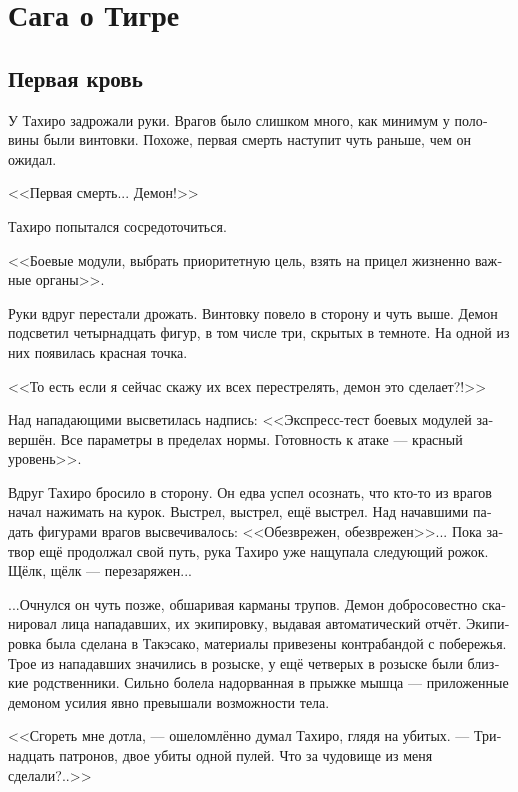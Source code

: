 \documentclass[a4paper,12pt,fleqn]{book}\usepackage{polyglossia}\setdefaultlanguage[babelshorthands=true]{russian}\setotherlanguage{english}\defaultfontfeatures{Ligatures=TeX,Mapping=tex-text}\usepackage{xcolor}\newcommand{\ml}[3]{#2}
\newcommand{\asterism}{\vspace{1em}{\centering\Large\bfseries$\ast~\ast~\ast$\par}\vspace{1em}}
\begin{document}
{\chapter{Сага о Тигре}


\section{Первая кровь}

У Тахиро задрожали руки.
Врагов было слишком много, как минимум у половины были винтовки.
Похоже, первая смерть наступит чуть раньше, чем он ожидал.

<<Первая смерть...
Демон!>>

Тахиро попытался сосредоточиться.

\ml{$0$}
{<<Боевые модули, выбрать приоритетную цель, взять на прицел жизненно важные органы>>.}
{``\textit{Combat modules, choose a priority target, aim a vital organ.}''}

Руки вдруг перестали дрожать.
Винтовку повело в сторону и чуть выше.
Демон подсветил четырнадцать фигур, в том числе три, скрытых в темноте.
На одной из них появилась красная точка.

<<То есть если я сейчас скажу их всех перестрелять, демон это сделает?!>>

Над нападающими высветилась надпись:
<<Экспресс-тест боевых модулей завершён.
Все параметры в пределах нормы.
Готовность к атаке --- красный уровень>>.

Вдруг Тахиро бросило в сторону.
Он едва успел осознать, что кто-то из врагов начал нажимать на курок.
Выстрел, выстрел, ещё выстрел.
Над начавшими падать фигурами врагов высвечивалось: <<Обезврежен, обезврежен>>...
Пока затвор ещё продолжал свой путь, рука Тахиро уже нащупала следующий рожок.
Щёлк, щёлк --- перезаряжен...

...Очнулся он чуть позже, обшаривая карманы трупов.
Демон добросовестно сканировал лица нападавших, их экипировку, выдавая автоматический отчёт.
Экипировка была сделана в Такэсако, материалы привезены контрабандой с побережья.
Трое из нападавших значились в розыске, у ещё четверых в розыске были близкие родственники.
Сильно болела надорванная в прыжке мышца --- приложенные демоном усилия явно превышали возможности тела.

<<Сгореть мне дотла, --- ошеломлённо думал Тахиро, глядя на убитых.
--- Тринадцать патронов, двое убиты одной пулей.
Что за чудовище из меня сделали?..>>

\asterism

}
\end{document}
